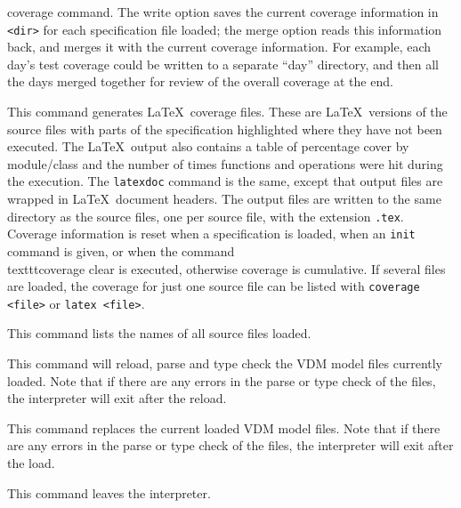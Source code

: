 \documentclass{overturerepchap}
\begin{document}
\begin{description}
  coverage command. The write option saves the current coverage
  information in \texttt{<dir>} for each specification file loaded; the merge
  option reads this information back, and merges it with the current
  coverage information. For example, each day's test coverage could be
  written to a separate ``day'' directory, and then all the days merged
  together for review of the overall coverage at the end.
\item[\texttt{latex|latexdoc [<files>]}:] This command generates \LaTeX\
  coverage files. These are \LaTeX\ versions of the source files
  with parts of the
  specification highlighted where they have not been executed. The
  \LaTeX\ output also contains a table of percentage cover by
  module/class and the number of times functions and operations were
  hit during the execution. The \texttt{latexdoc} command is the same,
  except that output files are wrapped in \LaTeX\ document headers. The
  output files are written to the same directory as the source files, one
  per source file, with the extension \texttt{.tex}. Coverage
  information is reset when a specification is loaded, when an \texttt{init}
  command is given, or when the
  command \\texttt{coverage clear} is executed, otherwise coverage is
  cumulative. If several files are loaded, the coverage for just one
  source file can be listed with \texttt{coverage <file>} or
  \texttt{latex <file>}.  
\item[\texttt{files}:] This command lists the names of all source files loaded.
  \index{files}\index{command!files} 
\item[\texttt{reload}:] This command will reload, parse and type check the
  VDM model files currently loaded. Note that if there are any errors
  in the parse or type check of the files, the interpreter will exit
  after the reload.\index{reload}\index{command!reload} 
\item[\texttt{load <files>}:] This command replaces the current loaded VDM
  model files. Note that if there are any errors in the parse or type
  check of the files, the interpreter will exit after
  the load.  
\item[\texttt{[q]uit}:] This command leaves the
  interpreter.  
\end{description}

\end{document}
